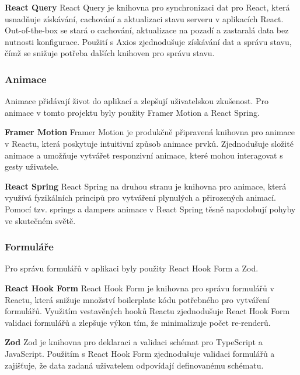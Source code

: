 \textbf{React Query}
React Query je knihovna pro synchronizaci dat pro React, která usnadňuje získávání, cachování a aktualizaci stavu serveru v aplikacích React.
Out-of-the-box se stará o cachování, aktualizace na pozadí a zastaralá data bez nutnosti konfigurace.
Použití s Axios zjednodušuje získávání dat a správu stavu, čímž se snižuje potřeba dalších knihoven pro správu stavu.

\subsubsection{Animace}
\label{sec:implementace-techologie-ostatni-animace}
Animace přidávají život do aplikací a zlepšují uživatelskou zkušenost.
Pro animace v tomto projektu byly použity Framer Motion a React Spring.

\textbf{Framer Motion}
Framer Motion je produkčně připravená knihovna pro animace v Reactu, která poskytuje intuitivní způsob animace prvků.
Zjednodušuje složité animace a umožňuje vytvářet responzivní animace, které mohou interagovat s gesty uživatele.

\textbf{React Spring}
React Spring na druhou stranu je knihovna pro animace, která využívá fyzikálních principů pro vytváření plynulých a přirozených animací.
Pomocí tzv. springs a dampers animace v React Spring těsně napodobují pohyby ve skutečném světě.

\subsubsection{Formuláře}
\label{sec:implementace-techologie-ostatni-formulare}
Pro správu formulářů v aplikaci byly použity React Hook Form a Zod.

\textbf{React Hook Form}
React Hook Form je knihovna pro správu formulářů v Reactu, která snižuje množství boilerplate kódu potřebného pro vytváření formulářů.
Využitím vestavěných hooků Reactu zjednodušuje React Hook Form validaci formulářů a zlepšuje výkon tím, že minimalizuje počet re-renderů.

\textbf{Zod}
Zod je knihovna pro deklaraci a validaci schémat pro TypeScript a JavaScript.
Použitím s React Hook Form zjednodušuje validaci formulářů a zajišťuje, že data zadaná uživatelem odpovídají definovanému schématu.

